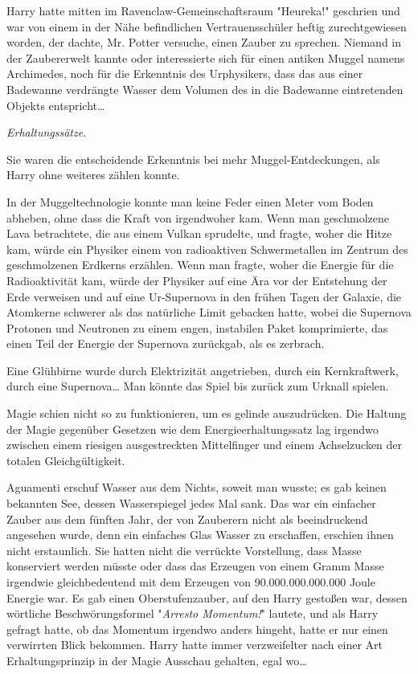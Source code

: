 {Harry hatte mitten im Ravenclaw-Gemeinschaftsraum "Heureka!" geschrien und war von einem in der Nähe befindlichen Vertrauensschüler heftig zurechtgewiesen worden, der dachte, Mr. Potter versuche, einen Zauber zu sprechen. Niemand in der Zaubererwelt kannte oder interessierte sich für einen antiken Muggel namens Archimedes, noch für die Erkenntnis des Urphysikers, dass das aus einer Badewanne verdrängte Wasser dem Volumen des in die Badewanne eintretenden Objekts entspricht…

\emph{Erhaltungssätze}.

Sie waren die entscheidende Erkenntnis bei mehr Muggel-Entdeckungen, als Harry ohne weiteres zählen konnte.

In der Muggeltechnologie konnte man keine Feder einen Meter vom Boden abheben, ohne dass die Kraft von irgendwoher kam. Wenn man geschmolzene Lava betrachtete, die aus einem Vulkan sprudelte, und fragte, woher die Hitze kam, würde ein Physiker einem von radioaktiven Schwermetallen im Zentrum des geschmolzenen Erdkerns erzählen. Wenn man fragte, woher die Energie für die Radioaktivität kam, würde der Physiker auf eine Ära vor der Entstehung der Erde verweisen und auf eine Ur-Supernova in den frühen Tagen der Galaxie, die Atomkerne schwerer als das natürliche Limit gebacken hatte, wobei die Supernova Protonen und Neutronen zu einem engen, instabilen Paket komprimierte, das einen Teil der Energie der Supernova zurückgab, als es zerbrach.

Eine Glühbirne wurde durch Elektrizität angetrieben, durch ein Kernkraftwerk, durch eine Supernova… Man könnte das Spiel bis zurück zum Urknall spielen.

Magie schien nicht so zu funktionieren, um es gelinde auszudrücken. Die Haltung der Magie gegenüber Gesetzen wie dem Energieerhaltungssatz lag irgendwo zwischen einem riesigen ausgestreckten Mittelfinger und einem Achselzucken der totalen Gleichgültigkeit.

Aguamenti erschuf Wasser aus dem Nichts, soweit man wusste; es gab keinen bekannten See, dessen Wasserspiegel jedes Mal sank. Das war ein einfacher Zauber aus dem fünften Jahr, der von Zauberern nicht als beeindruckend angesehen wurde, denn ein einfaches Glas Wasser zu erschaffen, erschien ihnen nicht erstaunlich. Sie hatten nicht die verrückte Vorstellung, dass Masse konserviert werden müsste oder dass das Erzeugen von einem Gramm Masse irgendwie gleichbedeutend mit dem Erzeugen von 90.000.000.000.000 Joule Energie war. Es gab einen Oberstufenzauber, auf den Harry gestoßen war, dessen wörtliche Beschwörungsformel "\emph{Arresto Momentum!}" lautete, und als Harry gefragt hatte, ob das Momentum irgendwo anders hingeht, hatte er nur einen verwirrten Blick bekommen. Harry hatte immer verzweifelter nach einer Art Erhaltungsprinzip in der Magie Ausschau gehalten, egal wo…

}
